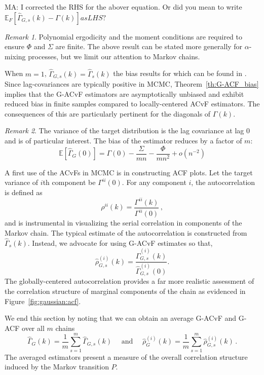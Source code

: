 \documentclass[11pt]{article}
\theoremstyle{remark}
\newtheorem{remark}{Remark}
\begin{document}
{\color{orange}MA: I corrected the RHS for the abover equation. Or did you mean to write $\mathbb{E}_F\left[\hat{\Gamma}_{G,s}(k) - \Gamma(k) \right]as LHS?$} 

\begin{remark}
Polynomial ergodicity and the moment conditions are required to ensure $\Phi$ and $\Sigma$ are finite. The above result can be stated more generally for $\alpha$-mixing processes, but we limit our attention to Markov chains. 
\end{remark}


When $m = 1$, $\hat{\Gamma}_{G,s}(k) = \hat{\Gamma}_{s}(k)
$ the bias results for which can be found in \cite{priestley1981spectral}. Since lag-covariances are typically positive in MCMC, Theorem~\ref{th:G-ACF_bias} implies that the G-ACvF estimators are asymptotically unbiased and exhibit reduced bias in finite samples compared to locally-centered ACvF estimators. The consequences of this are particularly pertinent for the diagonals of $\Gamma(k)$.
\begin{remark} \label{rem:lag0_expectation}
The variance of the target distribution is the lag covariance at lag 0 and is of particular interest. The bias of the estimator reduces by a factor of $m$:
\[
\mathbb{E} \left[\hat{\Gamma}_{G}(0) \right] = \Gamma(0) - \dfrac{\Sigma}{mn} - \dfrac{\Phi}{mn^2} + o(n^{-2})
\]
\end{remark}



A first use of the ACvFs in MCMC is in constructing ACF plots. Let the target variance of $i${th} component be $\Gamma^{ii}(0)$. For any component $i$, the autocorrelation is defined as
\[
\rho^{ii}(k) = \dfrac{\Gamma^{ii}(k)}{\Gamma^{ii}(0)}\,,
\]
and is instrumental in visualizing the serial correlation in components of the Markov chain. The typical estimate of the autocorrelation is constructed from $\hat{\Gamma}_s(k)$. Instead, we advocate for using G-ACvF estimates so that,
\[
\hat{\rho}_{G,s}^{(i)}(k) = \dfrac{ \hat{\Gamma}^{(i)}_{G,s} (k)}{\hat{\Gamma}^{(i)}_{G,s} (0)}.
\]
The globally-centered autocorrelation provides a far more realistic assessment of the correlation structure of marginal components of the chain  as evidenced in Figure~\ref{fig:gaussian:acf}. 

We end this section by noting that we can obtain an average G-ACvF and G-ACF over all $m$ chains
\[
\hat{\Gamma}_G(k) = \dfrac{1}{m}\sum_{s=1}^m \hat{\Gamma}_{G,s}(k) \quad \text{ and } \quad \hat{\rho}^{(i)}_G(k) = \dfrac{1}{m}\sum_{s=1}^m \hat{\rho}^{(i)}_{G,s}(k)\,.
\]
The averaged estimators present a measure of the overall correlation structure induced by the Markov transition $P$. 
\end{document}
